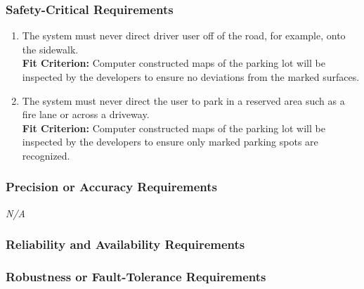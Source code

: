 \documentclass[12pt,letterpaper]{article}
\begin{document}
\subsubsection{Safety-Critical Requirements}
\begin{enumerate}[resume*] 
    \item The system must never direct driver user off of the road, for example,
    onto the sidewalk.\\
    \textbf{Fit Criterion:} Computer constructed maps of the parking lot will be
    inspected by the developers to ensure no deviations from the marked
    surfaces.
    \item The system must never direct the user to park in a reserved area such
    as a fire lane or across a driveway.\\
    \textbf{Fit Criterion:} Computer constructed maps of the parking lot will be
    inspected by the developers to ensure only marked parking spots are
    recognized.
\end{enumerate}

\subsubsection{Precision or Accuracy Requirements}
\noindent \emph{N/A}

\subsubsection{Reliability and Availability Requirements}
\color{black}


\subsubsection{Robustness or Fault-Tolerance Requirements}
\begin{enumerate}[resume*] 
\color{red}{
    \item In the event of lost connection to the system back-end, the most
    recent recommended parking spot will remain on the display.\\
    }
\end{enumerate}
\end{document}

